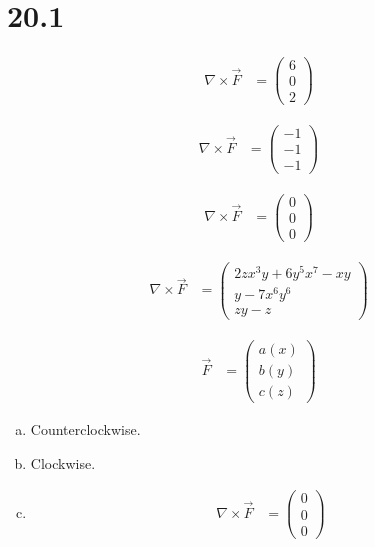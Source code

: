\documentclass[8pt]{extarticle}
\begin{document}
  \section{20.1}%
  \begin{description}[font=\normalfont]
    \item[6:] 
      \begin{align*}
        \nabla \times \vec{F} &= \begin{pmatrix}6\\0\\2\end{pmatrix}
      \end{align*}
    \item[8:]
      \begin{align*}
        \nabla \times \vec{F} &= \begin{pmatrix}-1\\-1\\-1\end{pmatrix}
      \end{align*}
    \item[10:]
      \begin{align*}
        \nabla \times \vec{F} &= \begin{pmatrix}0\\0\\0\end{pmatrix}
      \end{align*}
    \item[12:]
      \begin{align*}
        \nabla \times \vec{F} &= \begin{pmatrix}2zx^3y+6y^5x^7-xy\\y-7x^6y^6\\zy-z\end{pmatrix}
      \end{align*}
    \item[22:]
      \begin{align*}
        \vec{F} &= \begin{pmatrix}a(x)\\b(y)\\c(z)\end{pmatrix}
      \end{align*}
    \item[24:]\hfill
      \begin{enumerate}[(a)]
        \item Counterclockwise.
        \item Clockwise.
        \item 
          \begin{align*}
            \nabla \times \vec{F} &= \begin{pmatrix}0\\0\\0\end{pmatrix}
          \end{align*}
      \end{enumerate}
  \end{description}
\end{document}
